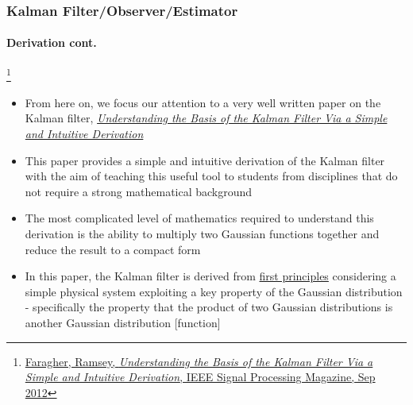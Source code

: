 \documentclass{beamer}
\begin{document}
\begin{frame}
\frametitle{Kalman Filter/Observer/Estimator}
\framesubtitle{Derivation \tiny cont.}

\footnote{\tiny\hspace{-0.23in} \href{http://www.cl.cam.ac.uk/~rmf25/papers/Understanding the Basis of the Kalman Filter.pdf}{Faragher, Ramsey, \emph{Understanding the Basis of the Kalman Filter Via a Simple and Intuitive Derivation}, IEEE Signal Processing Magazine, Sep 2012}}
\begin{itemize}\scriptsize
\item From here on, we focus our attention to a very well written paper on the Kalman filter,   \href{http://www.cl.cam.ac.uk/~rmf25/papers/Understanding the Basis of the Kalman Filter.pdf}{\color{blue} \emph{Understanding the Basis of the Kalman Filter Via a Simple and Intuitive Derivation}} 
\item This paper provides a simple and intuitive derivation of the Kalman filter with the aim of teaching this useful tool to students from disciplines that do not require a strong mathematical background
\item The most complicated level of mathematics required to understand this derivation is the ability to multiply two Gaussian functions together and reduce the result to a compact form
\item In this paper, the Kalman filter is derived from \underline{first principles} considering a simple physical system exploiting a key property of the Gaussian distribution - specifically the property that the product of two Gaussian distributions is another Gaussian distribution [function]
\end{itemize}
\end{frame}
\end{document}
